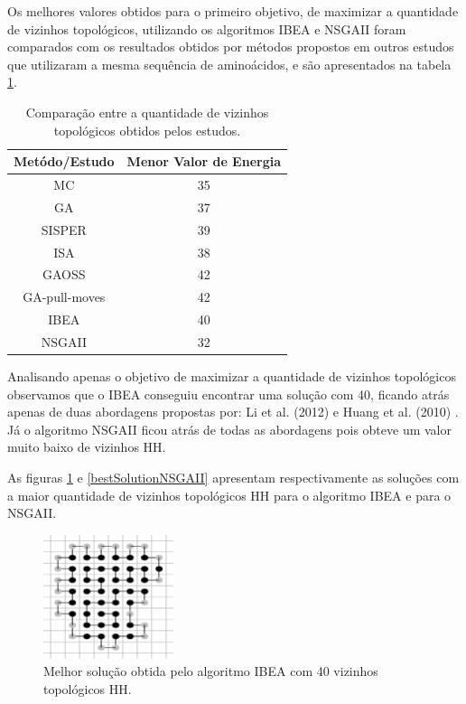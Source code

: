 \documentclass[conference]{IEEEtran}
\begin{document}
Os melhores valores obtidos para o primeiro objetivo, de maximizar a quantidade de vizinhos topológicos, utilizando os algoritmos IBEA e NSGAII foram comparados com os resultados obtidos por métodos propostos em outros estudos que utilizaram a mesma sequência de aminoácidos, e são apresentados na tabela \ref{tab:comparacao}.

\begin{table}[h]
	\centering
	\caption{Comparação entre a quantidade de vizinhos topológicos obtidos pelos estudos.}
	\label{tab:comparacao}
	\begin{tabular}{|c|c|}
		\hline
		{\bf Metódo/Estudo} & {\bf Menor Valor de Energia} \\ \hline
		MC \cite{unger1993genetic}               & 35                          \\ \hline
		GA   \cite{unger1993genetic}               & 37                          \\ \hline
		SISPER  \cite{zhang2002new}            & 39                          \\ \hline
		ISA \cite{huang2005improved}                & 38                          \\ \hline
		GAOSS  \cite{huang2010protein}             & 42                          \\ \hline
		GA-pull-moves \cite{li2012genetic}      & 42                          \\ \hline
		IBEA                & 40          \\ \hline 
		NSGAII & 32 \\
		\hline
	\end{tabular}
\end{table}

Analisando apenas o objetivo de maximizar a quantidade de vizinhos topológicos observamos que o IBEA conseguiu encontrar uma solução com 40, ficando atrás apenas de duas abordagens propostas por: Li et al. (2012) \cite{li2012genetic} e Huang et al. (2010) \cite{huang2010protein}. Já o algoritmo NSGAII ficou atrás de todas as abordagens pois obteve um valor muito baixo de vizinhos HH.


As figuras \ref{bestSolutionIBEA} e \ref{bestSolutionNSGAII} apresentam respectivamente as soluções com a maior quantidade de vizinhos topológicos HH para o algoritmo IBEA e para o NSGAII.

\begin{figure}[ht]
	\centering
	\includegraphics[width=1.5in]{ibeabestresults.png}
	\caption{Melhor solução obtida pelo algoritmo IBEA com 40 vizinhos topológicos HH.}
	\label{bestSolutionIBEA}
\end{figure}
\end{document}
